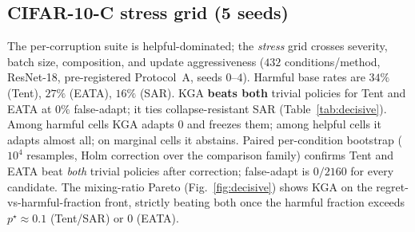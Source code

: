 \documentclass[conference]{IEEEtran}
\theoremstyle{plain}
\theoremstyle{definition}
\theoremstyle{remark}
\begin{document}
\subsection{CIFAR-10-C stress grid (5 seeds)}
The per-corruption suite is helpful-dominated; the \emph{stress} grid crosses severity,
batch size, composition, and update aggressiveness ($432$ conditions/method, ResNet-18,
pre-registered Protocol~A, seeds $0$--$4$). Harmful base rates are $34\%$ (Tent),
$27\%$ (EATA), $16\%$ (SAR). \textsc{KGA} \textbf{beats both} trivial policies for
Tent and EATA at $0\%$ false-adapt; it ties collapse-resistant SAR
(Table~\ref{tab:decisive}). Among harmful cells \textsc{KGA} adapts $0$ and freezes them;
among helpful cells it adapts almost all; on marginal cells it abstains. Paired per-condition
bootstrap ($10^4$ resamples, Holm correction over the comparison family) confirms Tent and
EATA beat \emph{both} trivial policies after correction; false-adapt is $0/2160$ for every
candidate. The mixing-ratio Pareto (Fig.~\ref{fig:decisive}) shows \textsc{KGA} on the
regret-vs-harmful-fraction front, strictly beating both once the harmful fraction exceeds
$p^\star{\approx}0.1$ (Tent/SAR) or $0$ (EATA).

\begin{table}[t]\centering\small
{}
\caption{CIFAR-10-C stress grid ($432$ conditions/method, five seeds, $\alpha{=}0.1$,
Protocol~A).}
\label{tab:decisive}
\end{table}
\end{document}
